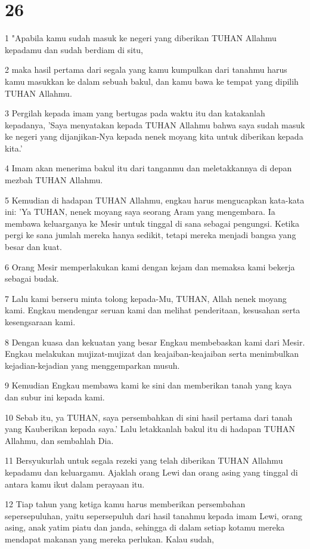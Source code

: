\chapter{26}

\par 1 "Apabila kamu sudah masuk ke negeri yang diberikan TUHAN Allahmu kepadamu dan sudah berdiam di situ,
\par 2 maka hasil pertama dari segala yang kamu kumpulkan dari tanahmu harus kamu masukkan ke dalam sebuah bakul, dan kamu bawa ke tempat yang dipilih TUHAN Allahmu.
\par 3 Pergilah kepada imam yang bertugas pada waktu itu dan katakanlah kepadanya, 'Saya menyatakan kepada TUHAN Allahmu bahwa saya sudah masuk ke negeri yang dijanjikan-Nya kepada nenek moyang kita untuk diberikan kepada kita.'
\par 4 Imam akan menerima bakul itu dari tanganmu dan meletakkannya di depan mezbah TUHAN Allahmu.
\par 5 Kemudian di hadapan TUHAN Allahmu, engkau harus mengucapkan kata-kata ini: 'Ya TUHAN, nenek moyang saya seorang Aram yang mengembara. Ia membawa keluarganya ke Mesir untuk tinggal di sana sebagai pengungsi. Ketika pergi ke sana jumlah mereka hanya sedikit, tetapi mereka menjadi bangsa yang besar dan kuat.
\par 6 Orang Mesir memperlakukan kami dengan kejam dan memaksa kami bekerja sebagai budak.
\par 7 Lalu kami berseru minta tolong kepada-Mu, TUHAN, Allah nenek moyang kami. Engkau mendengar seruan kami dan melihat penderitaan, kesusahan serta kesengsaraan kami.
\par 8 Dengan kuasa dan kekuatan yang besar Engkau membebaskan kami dari Mesir. Engkau melakukan mujizat-mujizat dan keajaiban-keajaiban serta menimbulkan kejadian-kejadian yang menggemparkan musuh.
\par 9 Kemudian Engkau membawa kami ke sini dan memberikan tanah yang kaya dan subur ini kepada kami.
\par 10 Sebab itu, ya TUHAN, saya persembahkan di sini hasil pertama dari tanah yang Kauberikan kepada saya.' Lalu letakkanlah bakul itu di hadapan TUHAN Allahmu, dan sembahlah Dia.
\par 11 Bersyukurlah untuk segala rezeki yang telah diberikan TUHAN Allahmu kepadamu dan keluargamu. Ajaklah orang Lewi dan orang asing yang tinggal di antara kamu ikut dalam perayaan itu.
\par 12 Tiap tahun yang ketiga kamu harus memberikan persembahan sepersepuluhan, yaitu sepersepuluh dari hasil tanahmu kepada imam Lewi, orang asing, anak yatim piatu dan janda, sehingga di dalam setiap kotamu mereka mendapat makanan yang mereka perlukan. Kalau sudah,
